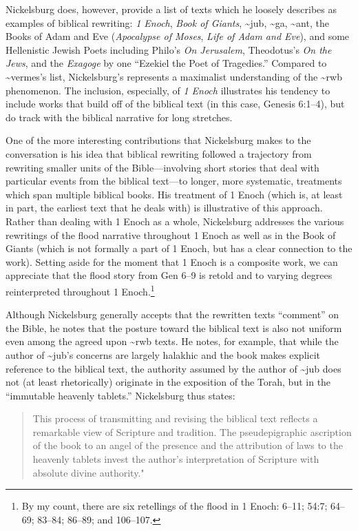 Nickelsburg does, however, provide a list of texts which he loosely
describes as examples of biblical rewriting: \emph{1 Enoch}, \emph{Book
of Giants}, \textasciitilde{}jub, \textasciitilde{}ga,
\textasciitilde{}ant, the Books of Adam and Eve (\emph{Apocalypse of
Moses}, \emph{Life of Adam and Eve}), and some Hellenistic Jewish Poets
including Philo's \emph{On Jerusalem}, Theodotus's \emph{On the Jews},
and the \emph{Exagoge} by one ``Ezekiel the Poet of Tragedies.''
Compared to \textasciitilde{}vermes's list, Nickelsburg's represents a
maximalist understanding of the \textasciitilde{}rwb phenomenon. The
inclusion, especially, of \emph{1 Enoch} illustrates his tendency to
include works that build off of the biblical text (in this case, Genesis
6:1--4), but do track with the biblical narrative for long stretches.

One of the more interesting contributions that Nickelsburg makes to the
conversation is his idea that biblical rewriting followed a trajectory
from rewriting smaller units of the Bible---involving short stories that
deal with particular events from the biblical text---to longer, more
systematic, treatments which span multiple biblical books. His treatment
of 1 Enoch (which is, at least in part, the earliest text that he deals
with) is illustrative of this approach. Rather than dealing with 1 Enoch
as a whole, Nickelsburg addresses the various rewritings of the flood
narrative throughout 1 Enoch as well as in the Book of Giants (which is
not formally a part of 1 Enoch, but has a clear connection to the work).
Setting aside for the moment that 1 Enoch is a composite work, we can
appreciate that the flood story from Gen 6--9 is retold and to varying
degrees reinterpreted throughout 1 Enoch.\footnote{By my count, there
  are six retellings of the flood in 1 Enoch: 6--11; 54:7; 64--69;
  83--84; 86--89; and 106--107.}

Although Nickelsburg generally accepts that the rewritten texts
``comment'' on the Bible, he notes that the posture toward the biblical
text is also not uniform even among the agreed upon \textasciitilde{}rwb
texts. He notes, for example, that while the author of
\textasciitilde{}jub's concerns are largely halakhic and the book makes
explicit reference to the biblical text, the authority assumed by the
author of \textasciitilde{}jub does not (at least rhetorically)
originate in the exposition of the Torah, but in the ``immutable
heavenly tablets.''\autocite[100--101]{nickelsburg_stone1984}
Nickelsburg thus states:

\begin{quote}
This process of transmitting and revising the biblical text reflects a
remarkable view of Scripture and tradition. The pseudepigraphic
ascription of the book to an angel of the presence and the attribution
of laws to the heavenly tablets invest the author's interpretation of
Scripture with absolute divine
authority."\autocite[101]{nickelsburg_stone1984}
\end{quote}

